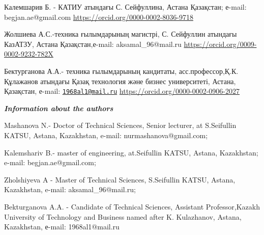 Калемшарив Б. - КАТИУ атындағы С. Сейфуллина, Астана Қазақстан; е-mail:
begjan.ae@gmail.com \url{https://orcid.org/0000-0002-8036-9718}

Жолшиева А.С.-техника ғылымдарының магистрі, С. Сейфуллин атындағы
КазАТЗУ, Астана Қазақстан,е-mail: aksamal\_96@mail.ru
\url{https://orcid.org/0009-0002-9232-782X}

Бектурганова А.А.- техника ғылымдарының кандитаты, асс.профессор,Қ.К.
Құлажанов атындағы Қазақ технология және бизнес университеті, Астана,
Қазақстан, е-mail:
\href{mailto:1968al1@mail.ru}{\nolinkurl{1968al1@mail.ru}}
\url{https://orcid.org/0000-0002-0906-2027}

\emph{{\bfseries Information about the authors}}

Mashanova N.- Doctor of Technical Sciences, Senior lecturer, at
S.Seifullin KATSU, Astana, Kazakhstan, e-mail: nurmashanova@gmail.com;

Kalemshariv B.- master of engineering, at.Seifullin KATSU, Astana,
Kazakhstan; e-mail: begjan.ae@gmail.com;

Zholshiyeva A - Master of Technical Sciences, S.Seifullin KATSU, Astana,
Kazakhstan, e-mail: aksamal\_96@mail.ru;

Bekturganova A.A. - Candidate of Technical Sciences, Assistant
Professor,Kazakh University of Technology and Business named after K.
Kulazhanov, Astana, Kazakhstan, е-mail: 1968al1@mail.ru
